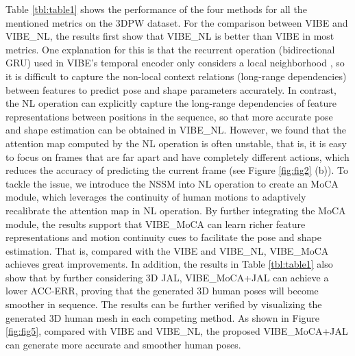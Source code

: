 \documentclass[10pt,twocolumn,letterpaper]{article}
\begin{document}
Table \ref{tbl:table1} shows the performance of the four methods for all the mentioned metrics on the 3DPW dataset. For the comparison between VIBE and VIBE\_{NL}, the results first show that VIBE\_{NL} is better than VIBE in most metrics. One explanation for this is that the recurrent operation (\ie  bidirectional GRU) used in VIBE's temporal encoder only considers a local neighborhood \cite{Wang2018NonlocalNN}, so it is difficult to capture the non-local context relations (\ie long-range dependencies) between features to predict pose and shape parameters accurately. In contrast, the NL operation can explicitly capture the long-range dependencies of feature representations between positions in the sequence, so that more accurate pose and shape estimation can be obtained in VIBE\_{NL}. However, we found that the attention map computed by the NL operation is often unstable, that is, it is easy to focus on frames that are far apart and have completely different actions, which reduces the accuracy of predicting the current frame (see Figure \ref{fig:fig2} (b)). To tackle the issue, we introduce the NSSM into NL operation to create an MoCA module, which leverages the continuity of human motions to adaptively recalibrate the attention map in NL operation. By further integrating the MoCA module, the results support that VIBE\_{MoCA} can learn richer feature representations and motion continuity cues to facilitate the pose and shape estimation. That is, compared with the VIBE and VIBE\_{NL}, VIBE\_{MoCA} achieves great improvements. In addition, the results in Table \ref{tbl:table1} also show that by further considering 3D JAL, VIBE\_{MoCA+JAL} can achieve a lower ACC-ERR, proving that the generated 3D human poses will become smoother in sequence. The results can be further verified by visualizing the generated 3D human mesh in each competing method. As shown in Figure \ref{fig:fig5}, compared with VIBE and VIBE\_{NL}, the proposed VIBE\_{MoCA+JAL} can generate more accurate and smoother human poses.
\end{document}
